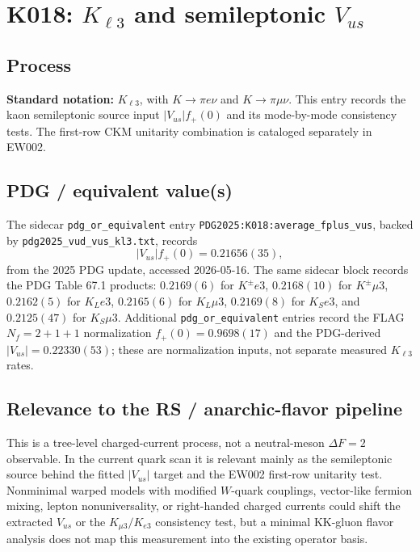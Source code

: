 
\section{K018: \(K_{\ell3}\) and semileptonic \(V_{us}\)}

\subsection*{Process}
\textbf{Standard notation:} \(K_{\ell3}\), with \(K\to\pi e\nu\) and
\(K\to\pi\mu\nu\).  This entry records the kaon semileptonic source input
\(|V_{us}|f_+(0)\) and its mode-by-mode consistency tests.  The first-row CKM
unitarity combination is cataloged separately in EW002.

\subsection*{PDG / equivalent value(s)}
The sidecar \texttt{pdg\_or\_equivalent} entry
\texttt{PDG2025:K018:average\_fplus\_vus}, backed by
\texttt{pdg2025\_vud\_vus\_kl3.txt}, records
\[
  |V_{us}|f_+(0)=0.21656(35),
\]
from the 2025 PDG update, accessed 2026-05-16.  The same sidecar block records
the PDG Table 67.1 products: \(0.2169(6)\) for \(K^\pm e3\),
\(0.2168(10)\) for \(K^\pm\mu3\), \(0.2162(5)\) for \(K_L e3\),
\(0.2165(6)\) for \(K_L\mu3\), \(0.2169(8)\) for \(K_S e3\), and
\(0.2125(47)\) for \(K_S\mu3\).  Additional \texttt{pdg\_or\_equivalent}
entries record the FLAG \(N_f=2+1+1\) normalization \(f_+(0)=0.9698(17)\)
and the PDG-derived \(|V_{us}|=0.22330(53)\); these are normalization inputs,
not separate measured \(K_{\ell3}\) rates.

\subsection*{Relevance to the RS / anarchic-flavor pipeline}
This is a tree-level charged-current process, not a neutral-meson
\(\Delta F=2\) observable.  In the current quark scan it is relevant mainly
as the semileptonic source behind the fitted \(|V_{us}|\) target and the
EW002 first-row unitarity test.  Nonminimal warped models with modified
\(W\)-quark couplings, vector-like fermion mixing, lepton nonuniversality, or
right-handed charged currents could shift the extracted \(V_{us}\) or the
\(K_{\mu3}/K_{e3}\) consistency test, but a minimal KK-gluon flavor analysis
does not map this measurement into the existing operator basis.

